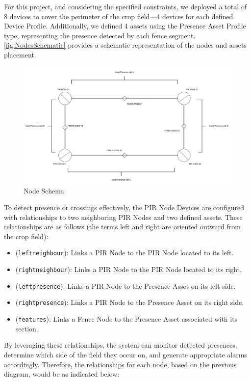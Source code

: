 For this project, and considering the specified constraints, we deployed a total of 8 devices to cover the perimeter of the crop field—4 devices for each defined Device 
Profile. Additionally, we defined 4 assets using the Presence Asset Profile type, representing the presence detected by each fence segment. \autoref{fig:NodesSchematic} provides a schematic 
representation of the nodes and assets placement.
\begin{figure}[H]
    \centering
    \includegraphics[width=1\textwidth]{./images/8/NodesSchematic.PNG}
    \caption{Node Schema}
    \label{fig:NodesSchematic}
\end{figure}

To detect presence or crossings effectively, the PIR Node Devices are configured with relationships to two neighboring PIR Nodes and two defined assets. These relationships 
are as follows (the terms left and right are oriented outward from the crop field):
\begin{itemize}
    \item (\texttt{leftneighbour}): Links a PIR Node to the PIR Node located to its left.
    \item (\texttt{rightneighbour}): Links a PIR Node to the PIR Node located to its right.
    \item (\texttt{leftpresence}): Links a PIR Node to the Presence Asset on its left side.
    \item (\texttt{rightpresence}): Links a PIR Node to the Presence Asset on its right side.
    \item (\texttt{features}): Links a Fence Node to the Presence Asset associated with its section.
\end{itemize}
By leveraging these relationships, the system can monitor detected presences, determine which side of the field they occur on, and generate appropriate alarms accordingly. 
Therefore, the relationships for each node, based on the previous diagram, would be as indicated below:



